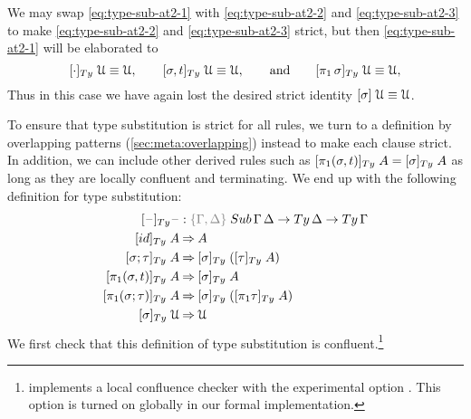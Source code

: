 \documentclass[a4paper,UKenglish,numberwithinsect,cleveref,thm-restate]{lipics-v2021}
\begin{document}
We may swap \eqref{eq:type-sub-at2-1} with \eqref{eq:type-sub-at2-2} and \eqref{eq:type-sub-at2-3} to make \eqref{eq:type-sub-at2-2} and \eqref{eq:type-sub-at2-3} strict, but then \eqref{eq:type-sub-at2-1} will be elaborated to 
\[
[ \emptysub ]_{\Ty}\;\UU         \judgeq \UU, \qquad
[ \sigma, t ]_{\Ty}\;\UU         \judgeq \UU, \qquad\text{and}\qquad 
[ \pi_1\,\sigma ]_{\Ty}\;\UU     \judgeq \UU,
\]
Thus in this case we have again lost the desired strict identity $[\sigma]\;\mathcal{U} \equiv \mathcal{U}$.
%

To ensure that type substitution is strict for all %
{rules}, we turn to a definition by overlapping patterns (\cref{sec:meta:overlapping}) instead to make each clause strict. 
In addition, we can include other derived rules such as $[\pi_1(\sigma, t)]_{\Ty}\;A = [ \sigma]_{\Ty}\;A$ as long as they are locally confluent and terminating.
We end up with the following definition for type substitution:
\begin{alignat}{3}
[\blank]_{\Ty} \blank            &: \implicit{\Gamma, \Delta} \; \Sub\,\Gamma\,\Delta \to \Ty\,\Delta \to \Ty\,\Gamma \nonumber \\
[ \idS ]_{\Ty}\;A                & \reduce A \label{eq:def-type-subst-1}\\
[ \sigma ; \tau ]_{\Ty}\;A       & \reduce [ \sigma ]_{\Ty}\;([ \tau ]_{\Ty}\;A) \label{eq:def-type-subst-2}\\
[ \pi_1(\sigma, t) ]_{\Ty}\;A    & \reduce [\sigma]_\Ty\;A                       \label{eq:def-type-subst-3} \\
[ \pi_1(\sigma; \tau) ]_{\Ty}\;A & \reduce [\sigma]_\Ty\;([\pi_1\tau]_\Ty\;A)    \label{eq:def-type-subst-4} \\
[ \sigma ]_{\Ty}\;\UU            & \reduce \UU                                   \label{eq:def-type-subst-5}
\end{alignat}
We first check that this definition of type substitution is confluent.\footnote{%
\Agda implements a local confluence checker with the experimental option .
This option is turned on globally in our formal implementation.}
\end{document}
